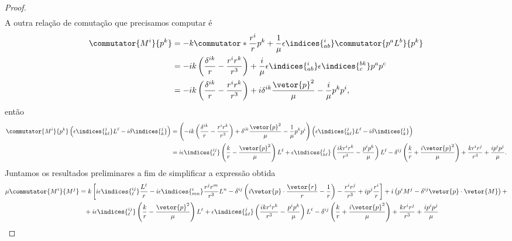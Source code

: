 \begin{proof}
\begin{align*}
   \end{align*}
   A outra relação de comutação que precisamos computar é
   \begin{align*}
      \commutator{M^i}{p^k} &= -k\commutator*{\frac{r^i}{r}}{p^k} + \frac{1}{\mu} \epsilon\indices{^i_{ab}}\commutator{p^a L^b}{p^k}\\
                            &= -ik \left(\frac{\delta^{ik}}{r} - \frac{r^i r^k}{r^3}\right) + \frac{i}{\mu} \epsilon\indices{^i_{ab}} \epsilon\indices{^{bk}_c} p^a p^c\\
                            &= -ik \left(\frac{\delta^{ik}}{r} - \frac{r^i r^k}{r^3}\right) +i\delta^{ik}\frac{\vetor{p}^2}{\mu} - \frac{i}{\mu} p^k p^i,
   \end{align*}
   então
   \begin{align*}
      \commutator{M^i}{p^k}\left(\epsilon\indices{^j_{k\ell}} L^\ell - i \delta\indices{^j_k}\right)
      &= \left(-ik \left(\frac{\delta^{ik}}{r} - \frac{r^i r^k}{r^3}\right) + \delta^{ik}\frac{\vetor{p}^2}{\mu} - \frac{1}{\mu} p^k p^i\right)\left(\epsilon\indices{^j_{k\ell}} L^\ell - i \delta\indices{^j_k}\right)\\
      &= i\epsilon\indices{^{ij}_\ell}\left(\frac{k}{r} - \frac{\vetor{p}^2}{\mu}\right)L^\ell + \epsilon\indices{^j_{k\ell}}\left(\frac{ikr^i r^k}{r^3} - \frac{p^i p^k}{\mu}\right)L^\ell - \delta^{ij} \left(\frac{k}{r} + \frac{i \vetor{p}^2}{\mu}\right) + \frac{kr^i r^j}{r^3} + \frac{i p^i p^j}{\mu}.
   \end{align*}
   Juntamos os resultados preliminares a fim de simplificar a expressão obtida
   \begin{align*}
      \mu\commutator{M^i}{M^j} &= k\left[i\epsilon\indices{^{ij}_\ell} \frac{L^\ell}{r} - i\epsilon\indices{^i_{mn}} \frac{r^j r^m}{r^3} L^n - \delta^{ij} \left(i \vetor{p} \cdot \frac{\vetor{r}}{r} - \frac{1}{r}\right) - \frac{r^i r^j}{r^3} + i p^j \frac{r^i}{r}\right]+ i \left(p^i M^j - \delta^{ij} \vetor{p} \cdot \vetor{M}\right) + \\
                            &{} \phantom{=} + i\epsilon\indices{^{ij}_\ell}\left(\frac{k}{r} - \frac{\vetor{p}^2}{\mu}\right)L^\ell + \epsilon\indices{^j_{k\ell}}\left(\frac{ikr^i r^k}{r^3} - \frac{p^i p^k}{\mu}\right)L^\ell - \delta^{ij} \left(\frac{k}{r} + \frac{i \vetor{p}^2}{\mu}\right) + \frac{kr^i r^j}{r^3} + \frac{i p^i p^j}{\mu}\\

\end{align*}
\end{proof}

